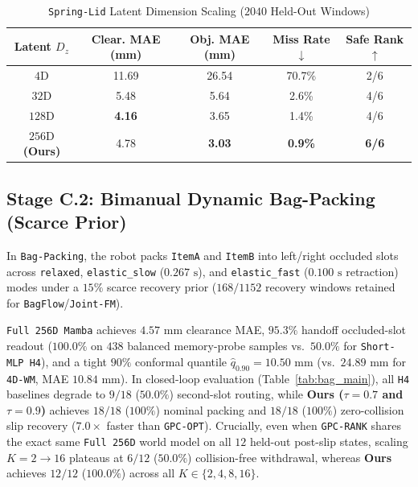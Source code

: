 \documentclass[letterpaper, 10pt, conference]{ieeeconf}
\begin{document}
\begin{table}[t]
\centering
\caption{\texttt{Spring-Lid} Latent Dimension Scaling ($2040$ Held-Out Windows)}
\label{tab:spring_dim}
\setlength{\tabcolsep}{3.5pt}
\begin{tabular}{ccccc}
\toprule
Latent $D_z$ & Clear. MAE (mm) & Obj. MAE (mm) & Miss Rate $\downarrow$ & Safe Rank $\uparrow$ \\
\midrule
$4\text{D}$ & 11.69 & 26.54 & 70.7\% & 2/6 \\
$32\text{D}$ & 5.48 & 5.64 & 2.6\% & 4/6 \\
$128\text{D}$ & \textbf{4.16} & 3.65 & 1.4\% & 4/6 \\
\textbf{$256\text{D}$ (Ours)} & 4.78 & \textbf{3.03} & \textbf{0.9\%} & \textbf{6/6} \\
\bottomrule
\end{tabular}
\end{table}

\subsection{Stage C.2: Bimanual Dynamic Bag-Packing (Scarce Prior)}
In \texttt{Bag-Packing}, the robot packs \texttt{ItemA} and \texttt{ItemB} into left/right occluded slots across \texttt{relaxed}, \texttt{elastic\_slow} ($0.267\text{ s}$), and \texttt{elastic\_fast} ($0.100\text{ s}$ retraction) modes under a $15\%$ scarce recovery prior ($168/1152$ recovery windows retained for \texttt{BagFlow}/\texttt{Joint-FM}).

\texttt{Full 256D Mamba} achieves $4.57\text{ mm}$ clearance MAE, $95.3\%$ handoff occluded-slot readout ($100.0\%$ on $438$ balanced memory-probe samples vs.\ $50.0\%$ for \texttt{Short-MLP H4}), and a tight $90\%$ conformal quantile $\hat{q}_{0.90} = 10.50\text{ mm}$ (vs.\ $24.89\text{ mm}$ for \texttt{4D-WM}, MAE $10.84\text{ mm}$). In closed-loop evaluation (Table~\ref{tab:bag_main}), all \texttt{H4} baselines degrade to $9/18$ ($50.0\%$) second-slot routing, while \textbf{Ours ($\tau=0.7$ and $\tau=0.9$)} achieves $18/18$ ($100\%$) nominal packing and $18/18$ ($100\%$) zero-collision slip recovery ($7.0\times$ faster than \texttt{GPC-OPT}). Crucially, even when \texttt{GPC-RANK} shares the exact same \texttt{Full 256D} world model on all $12$ held-out post-slip states, scaling $K=2 \to 16$ plateaus at $6/12$ ($50.0\%$) collision-free withdrawal, whereas \textbf{Ours} achieves $12/12$ ($100.0\%$) across all $K \in \{2,4,8,16\}$.
\end{document}
